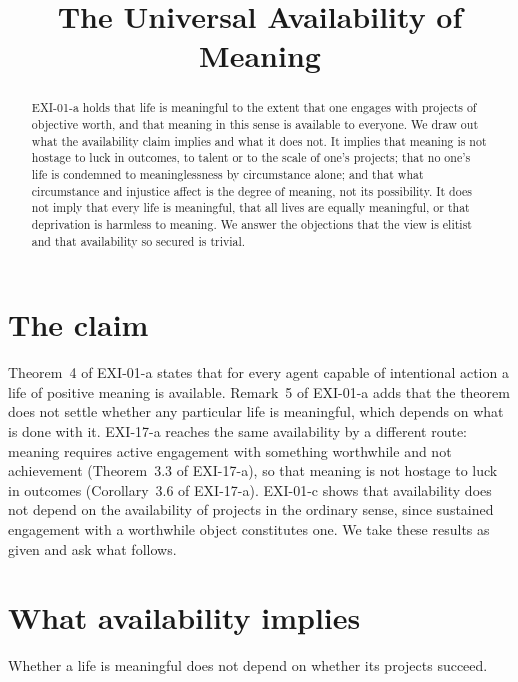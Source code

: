 \documentclass{situationist-preprint}
\title{The Universal Availability of Meaning}
\begin{document}
\maketitle

\begin{abstract}
EXI-01-a holds that life is meaningful to the extent that one engages with projects of objective worth, and that meaning in this sense is available to everyone. We draw out what the availability claim implies and what it does not. It implies that meaning is not hostage to luck in outcomes, to talent or to the scale of one's projects; that no one's life is condemned to meaninglessness by circumstance alone; and that what circumstance and injustice affect is the degree of meaning, not its possibility. It does not imply that every life is meaningful, that all lives are equally meaningful, or that deprivation is harmless to meaning. We answer the objections that the view is elitist and that availability so secured is trivial.
\end{abstract}

\section{The claim}

Theorem~4 of EXI-01-a states that for every agent capable of intentional action a life of positive meaning is available. Remark~5 of EXI-01-a adds that the theorem does not settle whether any particular life is meaningful, which depends on what is done with it. EXI-17-a reaches the same availability by a different route: meaning requires active engagement with something worthwhile and not achievement (Theorem~3.3 of EXI-17-a), so that meaning is not hostage to luck in outcomes (Corollary~3.6 of EXI-17-a). EXI-01-c shows that availability does not depend on the availability of projects in the ordinary sense, since sustained engagement with a worthwhile object constitutes one. We take these results as given and ask what follows.

\section{What availability implies}

\begin{proposition}\label{p:outcome}
Whether a life is meaningful does not depend on whether its projects succeed.
\end{proposition}
\end{document}
